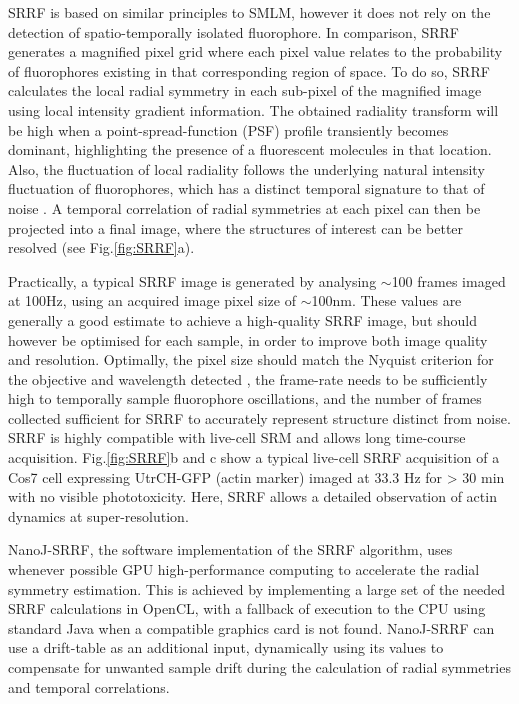  SRRF is based on similar principles to SMLM, however it does not rely on the detection of spatio-temporally isolated fluorophore. In comparison, SRRF generates a magnified pixel grid where each pixel value relates to the probability of fluorophores existing in that corresponding region of space. To do so, SRRF calculates the local radial symmetry in each sub-pixel of the magnified image using local intensity gradient information. The obtained radiality transform will be high when a point-spread-function (PSF) profile transiently becomes dominant, highlighting the presence of a fluorescent molecules in that location. Also, the fluctuation of local radiality follows the underlying natural intensity fluctuation of fluorophores, which has a distinct temporal signature to that of noise \cite{dertinger2009fast}. A temporal correlation of radial symmetries at each pixel can then be projected into a final image, where the structures of interest can be better resolved (see Fig.\ref{fig:SRRF}a).
 
 Practically, a typical SRRF image is generated by analysing $\sim$100 frames imaged at 100Hz, using an acquired image pixel size of $\sim$100nm. These values are generally a good estimate to achieve a high-quality SRRF image, but should however be optimised for each sample, in order to improve both image quality and resolution. Optimally, the pixel size should match the Nyquist criterion for the objective and wavelength detected \cite{pawley2010handbook}, the frame-rate needs to be sufficiently high to temporally sample fluorophore oscillations, and the number of frames collected sufficient for SRRF to accurately represent structure distinct from noise. SRRF is highly compatible with live-cell SRM and allows long time-course acquisition. Fig.\ref{fig:SRRF}b and c show a typical live-cell SRRF acquisition of a Cos7 cell expressing UtrCH-GFP (actin marker) imaged at 33.3 Hz for > 30 min with no visible phototoxicity. Here, SRRF allows a detailed observation of actin dynamics at super-resolution.
 
 NanoJ-SRRF, the software implementation of the SRRF algorithm, uses whenever possible GPU high-performance computing to accelerate the radial symmetry estimation. This is achieved by implementing a large set of the needed SRRF calculations in OpenCL, with a fallback of execution to the CPU using standard Java when a compatible graphics card is not found. NanoJ-SRRF can use a drift-table as an additional input, dynamically using its values to compensate for unwanted sample drift during the calculation of radial symmetries and temporal correlations.

